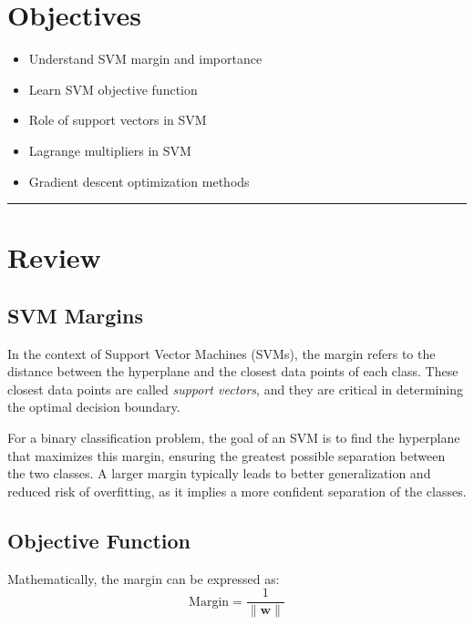 \section*{Objectives}
\begin{itemize}
    \item Understand SVM margin and importance
    \item Learn SVM objective function
    \item Role of support vectors in SVM
    \item Lagrange multipliers in SVM
    \item Gradient descent optimization methods
\end{itemize}


\rule[0.0051in]{\textwidth}{0.00025in}

\section{Review}
\subsection{SVM Margins}

In the context of Support Vector Machines (SVMs), the margin refers to the distance between the hyperplane and the closest data points of each class. 
These closest data points are called \textit{support vectors}, and they are critical in determining the optimal decision boundary.

For a binary classification problem, the goal of an SVM is to find the hyperplane that maximizes this margin, ensuring the greatest possible separation between the two classes. 
A larger margin typically leads to better generalization and reduced risk of overfitting, as it implies a more confident separation of the classes.

\subsection{Objective Function}

Mathematically, the margin can be expressed as:
\[
\text{Margin} = \frac{1}{\| \mathbf{w} \|}
\]

